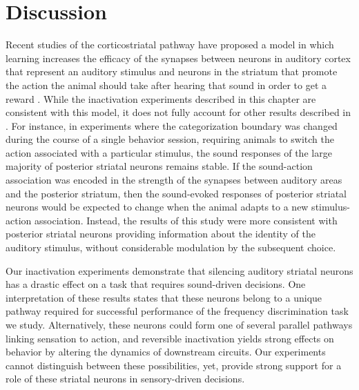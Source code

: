 \section{Discussion}

Recent studies of the corticostriatal pathway have proposed a model in which learning increases the efficacy of the synapses between neurons in auditory cortex that represent an auditory stimulus and neurons in the striatum that promote the action the animal should take after hearing that sound in order to get a reward \citep{Znamenskiy2013, Xiong2015}.
%
While the inactivation experiments described in this chapter are consistent with this model,  it does not fully account for other results described in \citet{Guo2018}.
%
For instance, in experiments where the categorization boundary was changed during the course of a single behavior session, requiring animals to switch the action associated with a particular stimulus, the sound responses of the large majority of posterior striatal neurons remains stable. 
%
If the sound-action association was encoded in the strength of the synapses between auditory areas and the posterior striatum, then the sound-evoked responses of posterior striatal neurons would be expected to change when the animal adapts to a new stimulus-action association.
%
Instead, the results of this study were more consistent with posterior striatal neurons providing information about the identity of the auditory stimulus, without considerable modulation by the subsequent choice. 

Our inactivation experiments demonstrate that silencing auditory striatal neurons has a drastic effect on a task that requires sound-driven decisions.
%
One interpretation of these results states that these neurons belong to a unique pathway required for successful performance of the frequency discrimination task we study.
%
Alternatively, these neurons could form one of several parallel pathways linking sensation to action, and reversible inactivation yields strong effects on behavior by altering the dynamics of downstream circuits.
%
Our experiments cannot distinguish between these possibilities, yet, provide strong support for a role of these striatal neurons in sensory-driven decisions.






